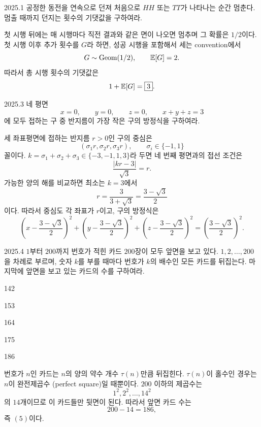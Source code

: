 \begin{pastproblem}{2025.1}
공정한 동전을 연속으로 던져 처음으로 $HH$ 또는 $TT$가 나타나는 순간 멈춘다. 멈출 때까지 던지는 횟수의 기댓값을 구하여라.
\end{pastproblem}

\begin{solution}
첫 시행 뒤에는 매 시행마다 직전 결과와 같은 면이 나오면 멈추며 그 확률은 $1/2$이다. 첫 시행 이후 추가 횟수를 $G$라 하면, 성공 시행을 포함해서 세는 convention에서
\[
G\sim\operatorname{Geom}(1/2),\qquad \mathbb{E}[G]=2.
\]
따라서 총 시행 횟수의 기댓값은
\[
1+\mathbb{E}[G]=\boxed{3}.
\]
\end{solution}

\begin{pastproblem}{2025.3}
네 평면
\[
x=0,\qquad y=0,\qquad z=0,\qquad x+y+z=3
\]
에 모두 접하는 구 중 반지름이 가장 작은 구의 방정식을 구하여라.
\end{pastproblem}

\begin{solution}
세 좌표평면에 접하는 반지름 $r>0$인 구의 중심은
\[
(\sigma_1r,\sigma_2r,\sigma_3r),\qquad \sigma_i\in\{-1,1\}
\]
꼴이다. $k=\sigma_1+\sigma_2+\sigma_3\in\{-3,-1,1,3\}$라 두면 네 번째 평면과의 접선 조건은
\[
\frac{|kr-3|}{\sqrt3}=r.
\]
가능한 양의 해를 비교하면 최소는 $k=3$에서
\[
r=\frac3{3+\sqrt3}=\frac{3-\sqrt3}{2}
\]
이다. 따라서 중심도 각 좌표가 $r$이고, 구의 방정식은
\[
\boxed{
\left(x-\frac{3-\sqrt3}{2}\right)^2+
\left(y-\frac{3-\sqrt3}{2}\right)^2+
\left(z-\frac{3-\sqrt3}{2}\right)^2
=\left(\frac{3-\sqrt3}{2}\right)^2}.
\]
\end{solution}

\begin{pastproblem}{2025.4}
$1$부터 $200$까지 번호가 적힌 카드 $200$장이 모두 앞면을 보고 있다. $1,2,\ldots,200$을 차례로 부르며, 숫자 $k$를 부를 때마다 번호가 $k$의 배수인 모든 카드를 뒤집는다. 마지막에 앞면을 보고 있는 카드의 수를 구하여라.
\begin{problemchoices}
\item 142
\item 153
\item 164
\item 175
\item 186
\end{problemchoices}
\end{pastproblem}

\begin{solution}
번호가 $n$인 카드는 $n$의 양의 약수 개수 $\tau(n)$만큼 뒤집힌다. $\tau(n)$이 홀수인 경우는 $n$이 완전제곱수 (perfect square)일 때뿐이다. $200$ 이하의 제곱수는
\[
1^2,2^2,\ldots,14^2
\]
의 $14$개이므로 이 카드들만 뒷면이 된다. 따라서 앞면 카드 수는
\[
200-14=\boxed{186},
\]
즉 $\boxed{(5)}$이다.
\end{solution}

